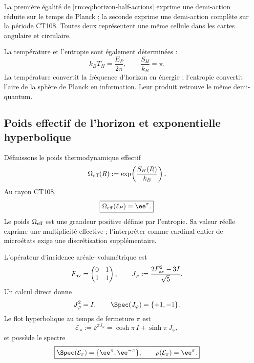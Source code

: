 La première égalité de \cref{rm:eq:horizon-half-actions} exprime une demi-action réduite sur le temps de Planck ; la seconde exprime une demi-action complète sur la période CT108. Toutes deux représentent une même cellule dans les cartes angulaire et circulaire.

La température et l’entropie sont également déterminées :
\begin{equation}
 k_BT_H=\frac{E_P}{2\pi},
 \qquad
 \boxed{\frac{S_H}{k_B}=\pi.}
 \label{rm:eq:horizon-CT108-TS}
\end{equation}
La température convertit la fréquence d’horizon en énergie ; l’entropie convertit l’aire de la sphère de Planck en information. Leur produit retrouve le même demi-quantum.

\subsection{Poids effectif de l’horizon et exponentielle hyperbolique}

Définissons le poids thermodynamique effectif
\begin{equation}
 \Omega_{\rm eff}(R):=\exp\!\left(\frac{S_H(R)}{k_B}\right).
 \label{rm:eq:horizon-effective-weight}
\end{equation}
Au rayon CT108,
\begin{equation}
 \boxed{\Omega_{\rm eff}(\ell_P)=\ee^\pi.}
 \label{rm:eq:horizon-effective-e-pi}
\end{equation}
Le poids \(\Omega_{\rm eff}\) est une grandeur positive définie par l’entropie. Sa valeur réelle exprime une multiplicité effective ; l’interpréter comme cardinal entier de microétats exige une discrétisation supplémentaire.

L’opérateur d’incidence aréale--volumétrique est
\begin{equation}
 F_{\rm av}=\begin{pmatrix}0&1\\1&1\end{pmatrix},
 \qquad
 J_\varphi:=\frac{2F_{\rm av}^2-3I}{\sqrt5}.
 \label{rm:eq:horizon-J-phi}
\end{equation}
Un calcul direct donne
\begin{equation}
 J_\varphi^2=I,
 \qquad
 \Spec(J_\varphi)=\{+1,-1\}.
 \label{rm:eq:horizon-J-involution}
\end{equation}
Le flot hyperbolique au temps de fermeture \(\pi\) est
\begin{equation}
 \mathcal E_\pi
 :=\ee^{\pi J_\varphi}
 =\cosh\pi\,I+\sinh\pi\,J_\varphi,
 \label{rm:eq:horizon-hyperbolic-flow}
\end{equation}
et possède le spectre
\begin{equation}
 \boxed{
 \Spec(\mathcal E_\pi)=\{\ee^\pi,\ee^{-\pi}\},
 \qquad
 \rho(\mathcal E_\pi)=\ee^\pi.}
 \label{rm:eq:horizon-hyperbolic-spectrum}
\end{equation}

